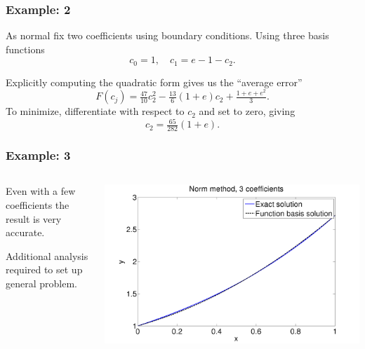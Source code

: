 \documentclass{beamer}
\begin{document}
\begin{frame}
  \frametitle{Example: 2}

  As normal fix two coefficients using boundary conditions. Using
  three basis functions
  \begin{equation*}
    c_0 = 1, \quad c_1 = e - 1 - c_2.
  \end{equation*} \pause

  \vspace{1ex}

  Explicitly computing the quadratic form gives us the ``average error''
  \begin{equation*}
    F(c_j) = \tfrac{47}{10} c_2^2 - \tfrac{13}{6} (1 + e) c_2 +
    \tfrac{1+e+e^2}{3}.
  \end{equation*} \pause
  To minimize, differentiate with respect to $c_2$ and set to zero,
  giving
  \begin{equation*}
    c_2 = \tfrac{65}{282} (1 + e).
  \end{equation*}

\end{frame}

\begin{frame}
  \frametitle{Example: 3}

  \begin{columns}
    \begin{column}{0.5\textwidth}
      Even with a few coefficients the result is very accurate. \pause

      \vspace{1ex}

      Additional analysis required to set up general problem.
    \end{column}
    \begin{column}{0.5\textwidth}
      \begin{center}
        \includegraphics[width=\textwidth]{figures/Norm1}
      \end{center}
    \end{column}
  \end{columns}
\end{frame}
\end{document}
